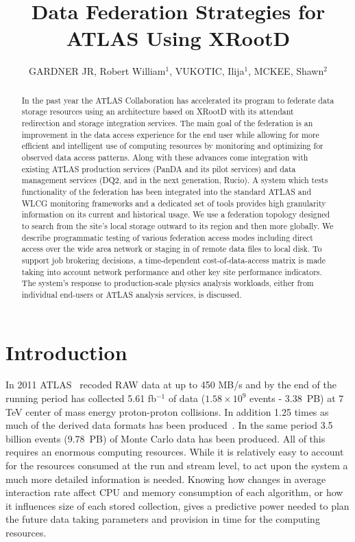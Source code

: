 \documentclass[a4paper]{jpconf}
\begin{document}
\title{Data Federation Strategies for ATLAS Using XRootD}

\author{GARDNER JR, Robert William$^1$, VUKOTIC, Ilija$^1$, MCKEE, Shawn$^2$ }

\address{$^1$ University of Chicago, 5620 S Ellis Ave, Chicago IL 60637, USA}
\address{$^2$ University of Michigan, ATLAS Group}


\begin{abstract}
 In the past year the ATLAS Collaboration has accelerated its program to federate data storage resources using an architecture based on XRootD with its attendant redirection and storage integration services. The main goal of the federation is an improvement in the data access experience for the end user while allowing for more efficient and intelligent use of computing resources by monitoring and optimizing for observed data access patterns. Along with these advances come integration with existing ATLAS production services (PanDA and its pilot services) and data management services (DQ2, and in the next generation, Rucio). A system which tests functionality of the federation has been integrated into the standard ATLAS and WLCG monitoring frameworks and a dedicated set of tools provides high granularity information on its current and historical usage. We use a federation topology designed to search from the site's local storage outward to its region and then more globally. We describe programmatic testing of various federation access modes including direct access over the wide area network or staging in of remote data files to local disk. To support job brokering decisions, a time-dependent cost-of-data-access matrix is made taking into account network performance and other key site performance indicators. The system's response to production-scale physics analysis workloads, either from individual end-users or ATLAS analysis services, is discussed.
\end{abstract}

\section{Introduction}

In 2011 ATLAS~\cite{atlas} recoded RAW data at up to 450 MB/s and by the end of the running period has collected 5.61 fb$^{-1}$ of data ($1.58\times10^{9}$ events - 3.38~PB) at 7 TeV center of mass energy proton-proton collisions. In addition 1.25 times as much of the derived data formats has been produced~\cite{boris}. In the same period 3.5 billion events (9.78~PB) of Monte Carlo data has been produced. All of this requires an enormous computing resources. While it is relatively easy to account for the resources consumed at the run and stream level, to act upon the system a much more detailed information is needed. Knowing how changes in average interaction rate affect CPU and memory consumption of each algorithm, or how it influences size of each stored collection, gives a predictive power needed to plan the future data taking parameters and provision in time for the computing resources.
\end{document}
